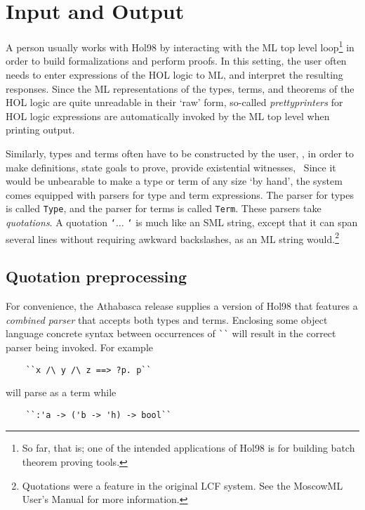 \documentclass[12pt,fleqn,a4paper]{report}
\begin{document}
\section{Input and Output}

A person usually works with Hol98  by interacting with the ML top level
loop\footnote{So far, that is; one of the intended applications of Hol98
is for building batch theorem proving tools.} in order to build
formalizations and perform proofs. In this setting, the user often needs
to enter expressions of the HOL logic to ML, and interpret the resulting
responses. Since the ML representations of the types, terms, and
theorems of the HOL logic are quite unreadable in their `raw' form,
so-called {\it prettyprinters\/} for HOL logic expressions are
automatically invoked by the ML top level when printing output.

Similarly, types and terms often have to be constructed by the user,
\eg, in order to make definitions, state goals to prove, provide
existential witnesses, \etc\ Since it would be unbearable to make a type
or term of any size `by hand', the system comes equipped with parsers
for type and term expressions. The parser for types is called
\verb+Type+, and the parser for terms is called \verb+Term+. These
parsers take {\it quotations\/}.  A quotation {\tt `}$\ldots$ {\tt `} is
much like an SML string, except that it can span several lines without
requiring awkward backslashes, as an ML string
would.\footnote{Quotations were a feature in the original LCF
system. See the MoscowML User's Manual for more information.}

\subsection{Quotation preprocessing}

For convenience, the Athabasca release supplies a version of Hol98 that
features a {\it combined parser\/} that accepts both types and
terms. Enclosing some object language concrete syntax between
occurrences of \verb+``+ will result in the correct parser being
invoked. For example

\begin{verbatim}
    ``x /\ y /\ z ==> ?p. p``
\end{verbatim}

\noindent will parse as a term while

\begin{verbatim}
    ``:'a -> ('b -> 'h) -> bool``
\end{verbatim}
\end{document}
